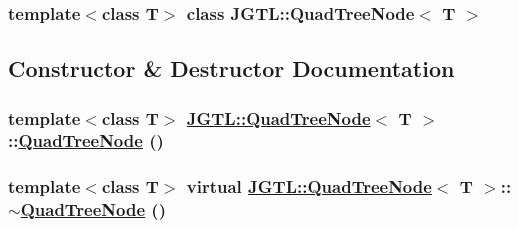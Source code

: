 \subsubsection*{template$<$class T$>$ class JGTL::Quad\-Tree\-Node$<$ T $>$}



\subsection{Constructor \& Destructor Documentation}
\hypertarget{class_j_g_t_l_1_1_quad_tree_node_7783c0e4e2c9e62c843e0b00dbb45931}{
\subsubsection[QuadTreeNode]{\setlength{\rightskip}{0pt plus 5cm}template$<$class T$>$ \hyperlink{class_j_g_t_l_1_1_quad_tree_node}{JGTL::Quad\-Tree\-Node}$<$ T $>$::\hyperlink{class_j_g_t_l_1_1_quad_tree_node}{Quad\-Tree\-Node} ()}}
\label{class_j_g_t_l_1_1_quad_tree_node_7783c0e4e2c9e62c843e0b00dbb45931}


\hypertarget{class_j_g_t_l_1_1_quad_tree_node_a21e240bd8cc15ffd970880b314e7183}{
\subsubsection[$\sim$QuadTreeNode]{\setlength{\rightskip}{0pt plus 5cm}template$<$class T$>$ virtual \hyperlink{class_j_g_t_l_1_1_quad_tree_node}{JGTL::Quad\-Tree\-Node}$<$ T $>$::$\sim$\hyperlink{class_j_g_t_l_1_1_quad_tree_node}{Quad\-Tree\-Node} ()}}
\label{class_j_g_t_l_1_1_quad_tree_node_a21e240bd8cc15ffd970880b314e7183}





